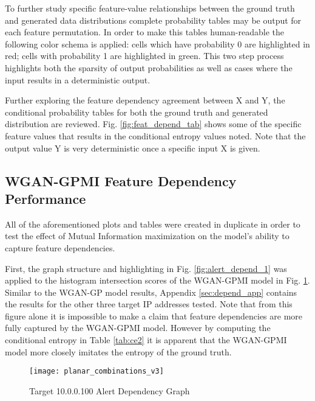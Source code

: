 To further study specific feature-value relationships between the ground truth and generated data distributions complete probability tables may be output for each feature permutation. In order to make this tables human-readable the following color schema is applied: cells which have probability 0 are highlighted in red; cells with probability 1 are highlighted in green. This two step process highlights both the sparsity of output probabilities as well as cases where the input results in a deterministic output.

Further exploring the feature dependency agreement between X and Y, the conditional probability tables for both the ground truth and generated distribution are reviewed. Fig. \ref{fig:feat_depend_tab} shows some of the specific feature values that results in the conditional entropy values noted. Note that the output value Y is very deterministic once a specific input X is given.



\subsection{WGAN-GPMI Feature Dependency Performance}

All of the aforementioned plots and tables were created in duplicate in order to test the effect of Mutual Information maximization on the model's ability to capture feature dependencies.

First, the graph structure and highlighting in Fig. \ref{fig:alert_depend_1} was applied to the histogram intersection scores of the WGAN-GPMI model in Fig. \ref{fig:alert_depend_5}. Similar to the WGAN-GP model results, Appendix \ref{sec:depend_app} contains the results for the other three target IP addresses tested. Note that from this figure alone it is impossible to make a claim that feature dependencies are more fully captured by the WGAN-GPMI model. However by computing the conditional entropy in Table \ref{tab:ce2} it is apparent that the WGAN-GPMI model more closely imitates the entropy of the ground truth.

\begin{figure}[!htbp]
	\centering
	\texttt{[image: planar\_combinations\_v3]}
	\caption{
		Target 10.0.0.100 Alert Dependency Graph
	}
	\label{fig:alert_depend_5}
\end{figure}

